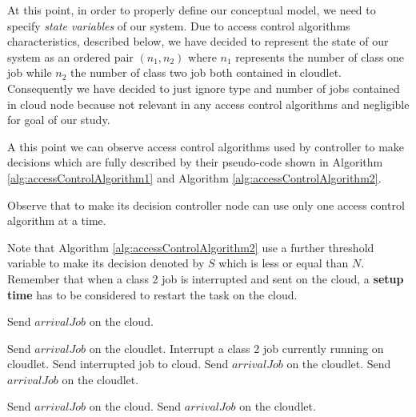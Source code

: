 \documentclass[10pt,a4paper]{article}
\begin{document}
At this point, in order to properly define our conceptual model, we need to specify \textit{state variables} of our system. 
Due to access control algorithms characteristics, described below, we have decided to represent the state of our system as an ordered pair $(n_1, n_2)$ where $n_1$ represents the number of class one job while $n_2$ the number of class two job both contained in cloudlet. Consequently we have decided to just ignore type and number of jobs contained in cloud node because not relevant in any access control algorithms and negligible for goal of our study. 

A this point we can observe access control algorithms used by controller to make decisions which are fully described by their pseudo-code shown in Algorithm \ref{alg:accessControlAlgorithm1} and Algorithm \ref{alg:accessControlAlgorithm2}. 

Observe that to make its decision controller node can use only one access control algorithm at a time. 

Note that Algorithm \ref{alg:accessControlAlgorithm2} use a further threshold variable to make its decision denoted by $S$ which is less or equal than $N$. Remember that when a class 2 job is interrupted and sent on the cloud, a \textbf{ setup time} has to be considered to restart the task on the cloud. 

\begin{algorithm}
\caption{}\label{alg:accessControlAlgorithm2}
\begin{algorithmic}[1]




	\State Send $\textit{arrivalJob}$ on the cloud.

	\State Send $\textit{arrivalJob}$ on the cloudlet.
	\State Interrupt a class 2 job currently running on cloudlet.
	\State Send interrupted job to cloud.
	\State Send $\textit{arrivalJob}$ on the cloudlet.
\Else 	
 	\State Send $\textit{arrivalJob}$ on the cloudlet.
\EndIf



\Else 

	\State Send $\textit{arrivalJob}$ on the cloud.
\Else 	
 	\State Send $\textit{arrivalJob}$ on the cloudlet.
\EndIf

\EndIf

\EndFunction

\end{algorithmic}
\end{algorithm}
\end{document}
